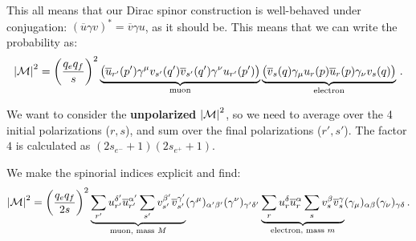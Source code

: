 \documentclass[main.tex]{subfiles}
\begin{document}
This all means that our Dirac spinor construction is well-behaved under conjugation: \((\overline{u} \gamma v)^{*} = \overline{v} \gamma u\), as it should be. 
This means that we can write the probability as: 
%
\begin{align}
\abs{\mathcal{M}}^2 = \qty(\frac{q_e q_f}{s})^2 
\underbrace{\qty(
\overline{u}_{r'}(p') \gamma^{\mu } v_{s'}(q') \overline{v}_{s'} (q') \gamma^{\nu } u_{r'}(p')
)}_{\text{muon}}
\underbrace{\qty(
\overline{v}_{s}(q) \gamma_{\mu} u_r (p) \overline{u}_{r}(p) \gamma_{\nu } v_s(q)
)}_{\text{electron}}
\,.
\end{align}

We want to consider the \textbf{unpolarized} \(\abs{\mathcal{M}}^2\), so we need to average over the 4 initial polarizations (\(r, s\)), and sum over the final polarizations (\(r', s'\)).
The factor \(4\) is calculated as \((2s_{e^{-}}+1) (2s_{e^{+}}+1)\). 

We make the spinorial indices explicit and find: 
%
\begin{align}
\abs{\mathcal{M}}^2 = 
\qty( \frac{q_e q_f}{2 s})^2 
\underbrace{\sum _{r'} u_{r'}^{ \delta'} \overline{u}^{\alpha '}_{r'}
\sum _{s'} v_{s'}^{ \beta'} \overline{v}^{\gamma '}_{s'}}_{\text{muon, mass }M}
(\gamma^{\mu })_{ \alpha ' \beta '}
(\gamma^{\nu })_{ \gamma ' \delta '}
\underbrace{\sum _{r} u_{r}^{ \delta} \overline{u}^{\alpha }_{r}
\sum _{s} v_{s}^{ \beta} \overline{v}^{\gamma }_{s}
}_{\text{electron, mass }m}
(\gamma_{\mu })_{ \alpha  \beta }
(\gamma_{\nu })_{ \gamma  \delta }
\,.
\end{align}
\end{document}

